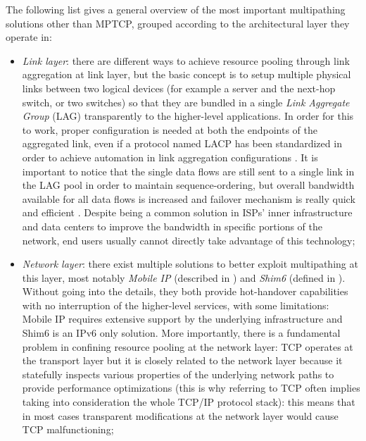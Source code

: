 The following list gives a general overview of the most important multipathing solutions other than MPTCP, grouped according to the architectural layer they operate in:
\begin{itemize}
  \item \textit{Link layer}: there are different ways to achieve resource pooling through link aggregation at link layer, but the basic concept is to setup multiple physical links between two logical devices (for example a server and the next-hop switch, or two switches) so that they are bundled in a single \textit{Link Aggregate Group} (LAG) transparently to the higher-level applications. In order for this to work, proper configuration is needed at both the endpoints of the aggregated link, even if a protocol named LACP has been standardized in order to achieve automation in link aggregation configurations \cite{thenetworkway}. It is important to notice that the single data flows are still sent to a single link in the LAG pool in order to maintain sequence-ordering, but overall bandwidth available for all data flows is increased and failover mechanism is really quick and efficient \cite{thenetworkway}. Despite being a common solution in ISPs' inner infrastructure and data centers to improve the bandwidth in specific portions of the network, end users usually cannot directly take advantage of this technology;
  \item \textit{Network layer}: there exist multiple solutions to better exploit multipathing at this layer, most notably \textit{Mobile IP} (described in ) and \textit{Shim6} (defined in ). Without going into the details, they both provide hot-handover capabilities with no interruption of the higher-level services, with some limitations: Mobile IP requires extensive support by the underlying infrastructure and Shim6 is an IPv6 only solution. More importantly, there is a fundamental problem in confining resource pooling at the network layer: TCP operates at the transport layer but it is closely related to the network layer because it statefully inspects various properties of the underlying network paths to provide performance optimizations (this is why referring to TCP often implies taking into consideration the whole TCP/IP protocol stack): this means that in most cases transparent modifications at the network layer would cause TCP malfunctioning;

\end{itemize}
